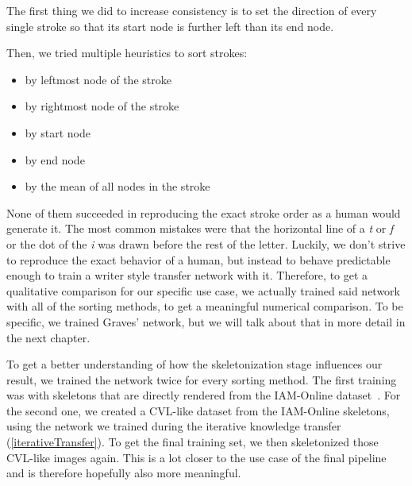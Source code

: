 The first thing we did to increase consistency is to set the direction of every single stroke so that its start node is further left than its end node.

Then, we tried multiple heuristics to sort strokes:
\begin{itemize}[topsep=0pt,itemsep=-1ex,partopsep=1ex,parsep=1ex]
\item by leftmost node of the stroke
\item by rightmost node of the stroke
\item by start node
\item by end node
\item by the mean of all nodes in the stroke
\end{itemize}

None of them succeeded in reproducing the exact stroke order as a human would generate it. The most common mistakes were that the horizontal line of a \emph{t} or \emph{f} or the dot of the \emph{i} was drawn before the rest of the letter. Luckily, we don't strive to reproduce the exact behavior of a human, but instead to behave predictable enough to train a writer style transfer network with it. Therefore, to get a qualitative comparison for our specific use case, we actually trained said network with all of the sorting methods, to get a meaningful numerical comparison. To be specific, we trained Graves' network, but we will talk about that in more detail in the next chapter.

To get a better understanding of how the skeletonization stage influences our result, we trained the network twice for every sorting method. The first training was with skeletons that are directly rendered from the IAM-Online dataset~\cite{iam-online}. For the second one, we created a CVL-like dataset from the IAM-Online skeletons, using the network we trained during the iterative knowledge transfer (\cref{iterativeTransfer}). To get the final training set, we then skeletonized those CVL-like images again. This is a lot closer to the use case of the final pipeline and is therefore hopefully also more meaningful.

